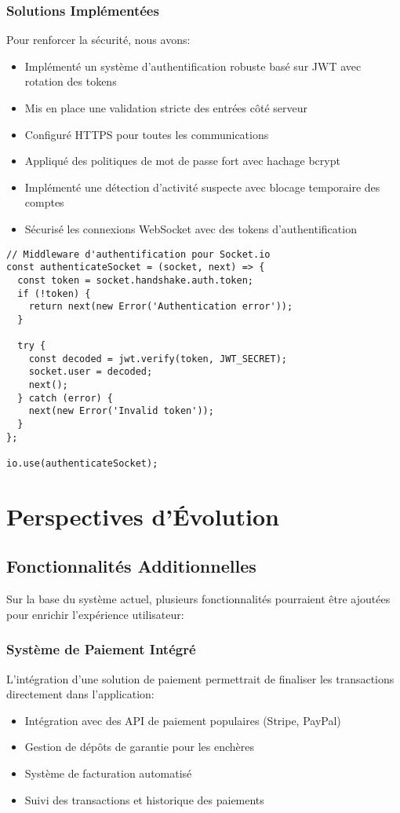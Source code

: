 \subsubsection{Solutions Implémentées}
Pour renforcer la sécurité, nous avons:
\begin{itemize}
    \item Implémenté un système d'authentification robuste basé sur JWT avec rotation des tokens
    \item Mis en place une validation stricte des entrées côté serveur
    \item Configuré HTTPS pour toutes les communications
    \item Appliqué des politiques de mot de passe fort avec hachage bcrypt
    \item Implémenté une détection d'activité suspecte avec blocage temporaire des comptes
    \item Sécurisé les connexions WebSocket avec des tokens d'authentification
\end{itemize}

\begin{verbatim}
// Middleware d'authentification pour Socket.io
const authenticateSocket = (socket, next) => {
  const token = socket.handshake.auth.token;
  if (!token) {
    return next(new Error('Authentication error'));
  }
  
  try {
    const decoded = jwt.verify(token, JWT_SECRET);
    socket.user = decoded;
    next();
  } catch (error) {
    next(new Error('Invalid token'));
  }
};

io.use(authenticateSocket);
\end{verbatim}

\section{Perspectives d'Évolution}

\subsection{Fonctionnalités Additionnelles}
Sur la base du système actuel, plusieurs fonctionnalités pourraient être ajoutées pour enrichir l'expérience utilisateur:

\subsubsection{Système de Paiement Intégré}
L'intégration d'une solution de paiement permettrait de finaliser les transactions directement dans l'application:
\begin{itemize}
    \item Intégration avec des API de paiement populaires (Stripe, PayPal)
    \item Gestion de dépôts de garantie pour les enchères
    \item Système de facturation automatisé
    \item Suivi des transactions et historique des paiements
\end{itemize}

